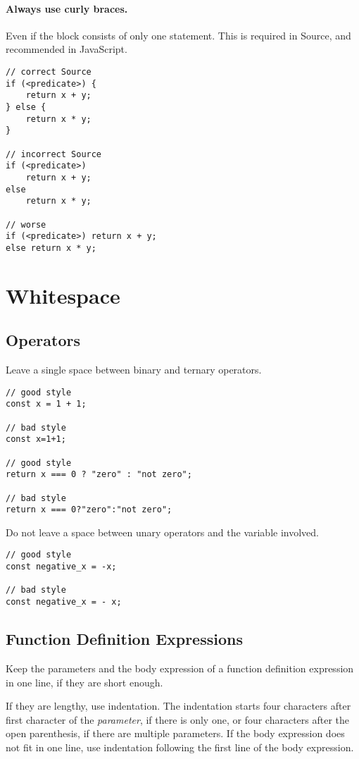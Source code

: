 \paragraph{Always use curly braces.} Even if the block consists of only 
  one statement.
  This is required in Source, and recommended in JavaScript.

\begin{lstlisting}
// correct Source
if (<predicate>) {
    return x + y;
} else {
    return x * y;
}

// incorrect Source
if (<predicate>) 
    return x + y;
else 
    return x * y;

// worse
if (<predicate>) return x + y;
else return x * y;
\end{lstlisting}

\section*{Whitespace}

  \subsection*{Operators}
    Leave a single space between binary and ternary operators.
	
\begin{lstlisting}
// good style
const x = 1 + 1;

// bad style
const x=1+1;

// good style
return x === 0 ? "zero" : "not zero";

// bad style
return x === 0?"zero":"not zero";
\end{lstlisting}
	
	Do not leave a space between unary operators and the variable involved.

\begin{lstlisting}
// good style
const negative_x = -x;

// bad style
const negative_x = - x;
\end{lstlisting}

\subsection*{Function Definition Expressions}

Keep the parameters and the body expression of a function definition expression
in one line, if they are short enough.

If they are lengthy, use
indentation. The indentation starts four characters after first character of
the \textit{parameter}, if there is only one,
or four characters after the open parenthesis,
if there are multiple parameters. If the body expression does not
fit in one line, use indentation following the first line of the body
expression. 

